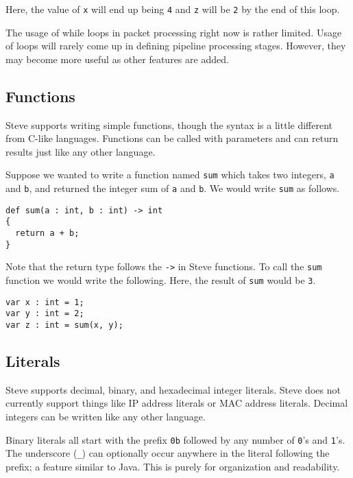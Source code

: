 Here, the value of \texttt{x} will end up being \texttt{4} and \texttt{z} will be \texttt{2} by the end of this loop.

The usage of while loops in packet processing right now is rather limited. Usage of loops will rarely come up in defining pipeline processing stages. However, they may become more useful as other features are added.

\subsection{Functions} \label{tut:function}

Steve supports writing simple functions, though the syntax is a little different from C-like languages. Functions can be called with parameters and can return results just like any other language. 

Suppose we wanted to write a function named \texttt{sum} which takes two integers, \texttt{a} and \texttt{b}, and returned the integer sum of \texttt{a} and \texttt{b}. We would write \texttt{sum} as follows.

\begin{codepage}
\begin{lstlisting}
def sum(a : int, b : int) -> int
{
  return a + b;
}
\end{lstlisting}
\end{codepage}

Note that the return type follows the \texttt{->} in Steve functions. To call the \texttt{sum} function we would write the following. Here, the result of \texttt{sum} would be \texttt{3}.

\begin{codepage}
\begin{lstlisting}
var x : int = 1;
var y : int = 2;
var z : int = sum(x, y);
\end{lstlisting}
\end{codepage}

\subsection{Literals} \label{tut:literal}

Steve supports decimal, binary, and hexadecimal integer literals. Steve does not currently support things like IP address literals or MAC address literals. Decimal integers can be written like any other language.

Binary literals all start with the prefix \texttt{0b} followed by any number of \texttt{0}'s and \texttt{1}'s. The underscore (\texttt{\_}) can optionally occur anywhere in the literal following the prefix; a feature similar to Java. This is purely for organization and readability.

